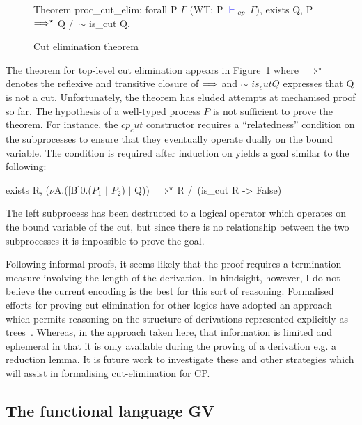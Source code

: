 \begin{figure}
\begin{coq}
Theorem proc_cut_elim:
  forall P $\Gamma$
         (WT: P ${\color{blue} {} \vdash {}}_{cp}$ $\Gamma$),
    exists Q, P $\Longrightarrow^\star$ Q /\ $\sim$ is_cut Q.
\end{coq}
\caption{Cut elimination theorem}
\label{fig:cutelim}
\end{figure}

The theorem for top-level cut elimination appears in Figure~\ref{fig:cutelim}
where $\Longrightarrow^\star$ denotes the reflexive and transitive closure of
$\Longrightarrow$ and $\sim$ \coqe$is_cut Q$ expresses that Q is not a cut.
Unfortunately, the theorem has eluded attempts at mechanised proof so far. The
hypothesis of a well-typed process \coqe$P$ is not sufficient to prove the
theorem. For instance, the \coqe$cp_cut$ constructor requires a
``relatedness'' condition on the subprocesses to ensure that they eventually
operate dually on the bound variable. The condition is required after
induction on  yields a goal similar to the following:
\begin{coq}
exists R, ($\nu$A.([B]0.($P_1$ $\mid$ $P_2$) $\mid$ Q)) $\Longrightarrow^\star$ R
          /\ (is_cut R -> False)
\end{coq}

The left subprocess has been destructed to a logical operator which operates
on the bound variable of the cut, but since there is no relationship between
the two subprocesses it is impossible to prove the goal.

Following informal proofs, it seems likely that the proof requires a
termination measure involving the length of the derivation. In hindsight,
however, I do not believe the current encoding is the best for this sort of
reasoning. Formalised efforts for proving cut elimination for other logics
have adopted an approach which permits reasoning on the structure of
derivations represented explicitly as
trees~\cite{Tews:2013,Dawson:2010,Dawson:2002}. Whereas, in the approach taken
here, that information is limited and ephemeral in that it is only available
during the proving of a derivation e.g. a reduction lemma. It is future work
to investigate these and other strategies which will assist in formalising
cut-elimination for CP.

\subsection{The functional language GV}\label{sec:gv}

